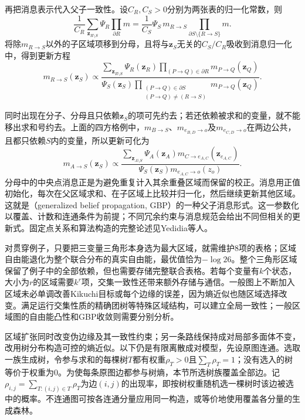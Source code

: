 再把消息表示代入父子一致性。设$C_R,C_S>0$分别为两张表的归一化常数，则
\[
  \frac{1}{C_R}\sum_{\bm z_{R\setminus S}}
        \Psi_R\prod_{\partial R}m
    =\frac{1}{C_S}\Psi_S\,m_{R\to S}
        \prod_{\partial S\setminus\{R\to S\}}m.
\]
将除$m_{R\to S}$以外的子区域项移到分母，且将与$\bm z_S$无关的$C_S/C_R$吸收到消息归一化中，得到更新方程
\begin{equation}
  m_{R\to S}(\bm z_S)\propto
  \frac{\displaystyle
    \sum_{\bm z_{R\setminus S}}
      \Psi_R(\bm z_R)
       \prod_{(P\to Q)\in\partial R}m_{P\to Q}(\bm z_Q)}
  {\displaystyle
    \Psi_S(\bm z_S)
       \prod_{\substack{(P\to Q)\in\partial S\\(P\to Q)\ne(R\to S)}}
          m_{P\to Q}(\bm z_Q)}.
  \label{eq:pgm-variational-gbp}
\end{equation}

同时出现在分子、分母且只依赖$\bm z_S$的项可先约去；若还依赖被求和的变量，就不能移出求和号约去。上面的四方格例中，$m_{B\to S}$、$m_{e_{B,D}\to o}$及$m_{e_{C,D}\to o}$在两边公共，且都只依赖$S$内的变量，所以更新可化为
\[
  m_{A\to S}(\bm z_S)\propto
     \frac{\displaystyle\sum_{\bm z_{A\setminus S}}
          \Psi_A(\bm z_A)
          m_{C\to e_{A,C}}(\bm z_{e_{A,C}})}
          {\Psi_S(\bm z_S)m_{e_{A,C}\to o}(z_o)}.
\]
分母中的中央点消息正是为避免重复计入其余重叠区域而保留的校正。消息用正值初始化，每次在父区域求和、在子区域上比较并归一化，然后继续更新其他区域。这就是（generalized belief propagation, GBP）的一种父子消息形式。这一参数化以覆盖、计数和连通条件为前提；不同冗余约束与消息规范会给出不同但相关的更新式。固定点关系和算法构造的完整论述见Yedidia等人。

对贯穿例子，只要把三变量三角形本身选为最大区域，就需维护$8$项的表格；区域自由能退化为整个联合分布的真实自由能，最优值恰为$-\log26$。整个三角形区域保留了例子中的全部依赖，但也需要存储完整联合表格。若每个变量有$k$个状态，大小为$r$的区域需要$k^r$项，交集一致性还带来额外存储与通信。一般图上不断加入区域未必单调改善Kikuchi目标或每个边缘的误差，因为熵近似也随区域选择改变。满足运行交集性质的精确团树等特殊区域结构，可以建立全局一致性；一般区域图的自由能凸性和GBP收敛则需要分别分析。

区域扩张同时改变伪边缘及其一致性约束；另一条路线保持成对局部多面体不变，改用树分布构造可控的熵近似。以下仍是有限离散成对模型，先设原图连通。选取一族生成树，令参与求和的每棵树$T$都有权重$\rho_T>0$且$\sum_T\rho_T=1$；没有选入的树等价于权重为$0$。为使每条原图边都参与树熵，本节所选树族覆盖全部边。记$\rho_{i,j}=\sum_{T:(i,j)\in T}\rho_T$为边$(i,j)$的出现率，即按树权重随机选一棵树时该边被选中的概率。不连通图可按各连通分量应用同一构造，或等价地使用覆盖各分量的生成森林。

